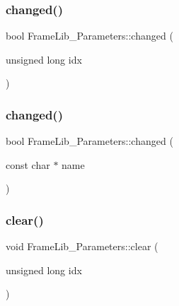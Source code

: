 \subsubsection{\texorpdfstring{changed()}{changed()}\hspace{0.1cm}{\footnotesize\ttfamily [1/2]}}
{\footnotesize\ttfamily bool Frame\+Lib\+\_\+\+Parameters\+::changed (\begin{DoxyParamCaption}\item[{unsigned long}]{idx }\end{DoxyParamCaption})\hspace{0.3cm}{\ttfamily [inline]}}

\mbox{\label{class_frame_lib___parameters_a6bd6af480a8d8f589ee7443c690f75b0}} 
\subsubsection{\texorpdfstring{changed()}{changed()}\hspace{0.1cm}{\footnotesize\ttfamily [2/2]}}
{\footnotesize\ttfamily bool Frame\+Lib\+\_\+\+Parameters\+::changed (\begin{DoxyParamCaption}\item[{const char $\ast$}]{name }\end{DoxyParamCaption})\hspace{0.3cm}{\ttfamily [inline]}}

\mbox{\label{class_frame_lib___parameters_a5c0764e11e7723b034fc9951b4dcfb3e}} 
\subsubsection{\texorpdfstring{clear()}{clear()}\hspace{0.1cm}{\footnotesize\ttfamily [1/2]}}
{\footnotesize\ttfamily void Frame\+Lib\+\_\+\+Parameters\+::clear (\begin{DoxyParamCaption}\item[{unsigned long}]{idx }\end{DoxyParamCaption})\hspace{0.3cm}{\ttfamily [inline]}}

